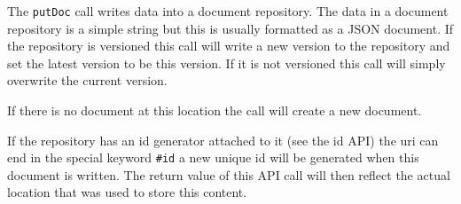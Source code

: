 The \verb+putDoc+ call writes data into a \Rapture document repository. The
data in a document repository is a simple string but this is usually formatted
as a JSON document. If the repository is versioned this call will write a new
version to the repository and set the latest version to be this version. If it
is not versioned this call will simply overwrite the current version.

If there is no document at this location the call will create a new document.

If the repository has an id generator attached to it (see the id API) the uri
can end in the special keyword \verb+#id+ a new unique id will be generated when
this document is written. The return value of this API call will then reflect
the actual location that was used to store this content.

